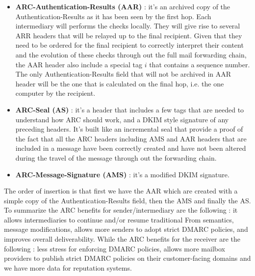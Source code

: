 \begin{itemize}
\item \textbf{ARC-Authentication-Results (AAR)} : it's an archived copy of the Authentication-Results as it has been seen by the first hop. Each intermediary will performs the checks locally. They will give rise to several ARR headers that will be relayed up to the final recipient. Given that they need to be ordered for the final recipient to correctly interpret their content and the evolution of these checks through out the full mail forwarding chain, the AAR header also include a special tag $i$ that contains a sequence number. The only Authentication-Results field that will not be archived in AAR header will be the one that is calculated on the final hop, i.e. the one computer by the recipient.
\item \textbf{ARC-Seal (AS)} : it's a header that includes a few tags that are needed to understand how ARC should work, and a DKIM style signature of any preceding headers. It's built like an incremental seal that provide a proof of the fact that all the ARC headers including AMS and AAR headers that are included in a message have been correctly created and have not been altered during the travel of the message through out the forwarding chain.
\item \textbf{ARC-Message-Signature (AMS)} : it's a modified DKIM signature.
\end{itemize}
The order of insertion is that first we have the AAR which are created with a simple copy of the Authentication-Results field, then the AMS and finally the AS. To summarize the ARC benefits for sender/intermediary are the following : it allows intermediaries to continue and/or resume traditional From semantics, message modifications, allows more senders to adopt strict DMARC policies, and improves overall deliverability. While the ARC benefits for the receiver are the following : less stress for enforcing DMARC policies, allows more mailbox providers to publish strict DMARC policies on their customer-facing domains and we have more data for reputation systems.

